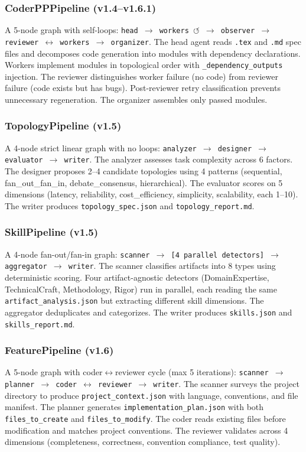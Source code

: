 \subsubsection{CoderPPPipeline (v1.4--v1.6.1)}
A 5-node graph with self-loops: \texttt{head $\rightarrow$ workers $\circlearrowleft$ $\rightarrow$ observer $\rightarrow$ reviewer $\leftrightarrow$ workers $\rightarrow$ organizer}. The head agent reads \texttt{.tex} and \texttt{.md} spec files and decomposes code generation into modules with dependency declarations. Workers implement modules in topological order with \texttt{\_dependency\_outputs} injection. The reviewer distinguishes worker failure (no code) from reviewer failure (code exists but has bugs). Post-reviewer retry classification prevents unnecessary regeneration. The organizer assembles only passed modules.

\subsubsection{TopologyPipeline (v1.5)}
A 4-node strict linear graph with no loops: \texttt{analyzer $\rightarrow$ designer $\rightarrow$ evaluator $\rightarrow$ writer}. The analyzer assesses task complexity across 6 factors. The designer proposes 2--4 candidate topologies using 4 patterns (sequential, fan\_out\_fan\_in, debate\_consensus, hierarchical). The evaluator scores on 5 dimensions (latency, reliability, cost\_efficiency, simplicity, scalability, each 1--10). The writer produces \texttt{topology\_spec.json} and \texttt{topology\_report.md}.

\subsubsection{SkillPipeline (v1.5)}
A 4-node fan-out/fan-in graph: \texttt{scanner $\rightarrow$ [4 parallel detectors] $\rightarrow$ aggregator $\rightarrow$ writer}. The scanner classifies artifacts into 8 types using deterministic scoring. Four artifact-agnostic detectors (DomainExpertise, TechnicalCraft, Methodology, Rigor) run in parallel, each reading the same \texttt{artifact\_analysis.json} but extracting different skill dimensions. The aggregator deduplicates and categorizes. The writer produces \texttt{skills.json} and \texttt{skills\_report.md}.

\subsubsection{FeaturePipeline (v1.6)}
A 5-node graph with coder$\leftrightarrow$reviewer cycle (max 5 iterations): \texttt{scanner $\rightarrow$ planner $\rightarrow$ coder $\leftrightarrow$ reviewer $\rightarrow$ writer}. The scanner surveys the project directory to produce \texttt{project\_context.json} with language, conventions, and file manifest. The planner generates \texttt{implementation\_plan.json} with both \texttt{files\_to\_create} and \texttt{files\_to\_modify}. The coder reads existing files before modification and matches project conventions. The reviewer validates across 4 dimensions (completeness, correctness, convention compliance, test quality).

